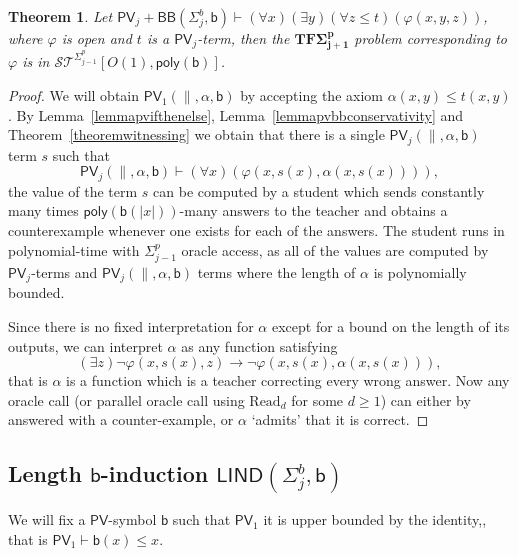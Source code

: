 \documentclass[11pt]{article}
\newcommand{\poly}{\mathsf{poly}}
\newcommand{\PV}{\mathsf{PV}}
\newcommand{\bd}{\mathsf{b}}
\newcommand{\Read}{\text{Read}}
\newcommand{\abs}[1]{\lvert #1 \rvert}
\newtheorem{theorem}{Theorem}[section]
\theoremstyle{definition}
\theoremstyle{definition}
\theoremstyle{remark}
\begin{document}
\begin{theorem} \label{thm:bbwitness}
    Let $\PV_j+\mathsf{BB}(\Sigma^b_{j},\bd)\vdash (\forall x)(\exists y)(\forall z\leq t)(\varphi(x,y,z))$, where $\varphi$ is open and $t$ is a $\PV_j$-term, then the $\mathbf{TF\Sigma^p_{j+1}}$ problem corresponding to $\varphi$ is in $\mathcal{ST}^{\Sigma^p_{j-1}}[O(1),\poly(\bd)]$.
\end{theorem}
\begin{proof}
     We will obtain $\PV_1(\parallel, \alpha,\bd)$ by accepting the axiom $\alpha(x,y)\leq t(x,y)$. By Lemma~\ref{lemmapvifthenelse}, Lemma~\ref{lemmapvbbconservativity} and Theorem~\ref{theoremwitnessing} we obtain that there is a single $\PV_j(\parallel,\alpha,\bd)$ term $s$ such that
    \[\PV_j(\parallel,\alpha,\bd)\vdash (\forall x)(\varphi(x,s(x),\alpha(x,s(x)))),\]
    the value of the term $s$ can be computed by a student which sends constantly many times $\poly(\bd(\abs{x}))$-many answers to the teacher and obtains a counterexample whenever one exists for each of the answers. The student runs in polynomial-time with $\Sigma^p_{j-1}$ oracle access, as all of the values are computed by $\PV_j$-terms and $\PV_j(\parallel,\alpha,\bd)$ terms where the length of $\alpha$ is polynomially bounded.

    Since there is no fixed interpretation for $\alpha$ except for a bound on the length of its outputs, we can interpret $\alpha$ as any function satisfying
    \[(\exists z)\lnot \varphi(x,s(x),z) \to \lnot \varphi(x,s(x),\alpha(x,s(x))),\]
    that is $\alpha$ is a function which is a teacher correcting every wrong answer. Now any oracle call (or parallel oracle call using $\Read_{d}$ for some $d\geq 1$) can either by answered with a counter-example, or $\alpha$ `admits' that it is correct.
\end{proof}

\subsection{Length \texorpdfstring{$\bd$}{b}-induction \texorpdfstring{$\mathsf{LIND}(\Sigma^b_j,\bd)$}{LIND}}

We will fix a $\PV$-symbol $\bd$ such that $\PV_1$ it is upper bounded by the identity,, that is $\PV_1\vdash \bd(x)\leq x$. 
\end{document}
